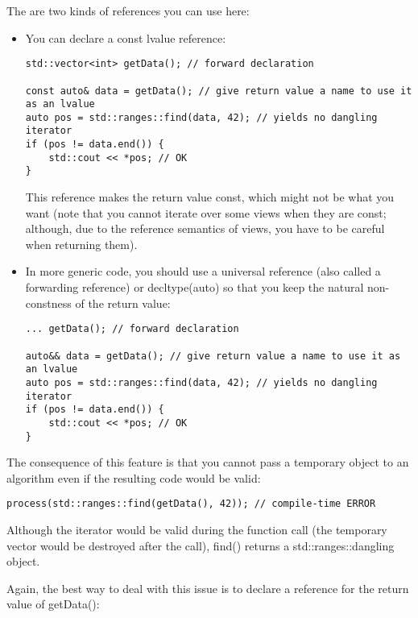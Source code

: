 The are two kinds of references you can use here:

\begin{itemize}
\item
You can declare a const lvalue reference:

\begin{lstlisting}[style=styleCXX]
std::vector<int> getData(); // forward declaration

const auto& data = getData(); // give return value a name to use it as an lvalue
auto pos = std::ranges::find(data, 42); // yields no dangling iterator
if (pos != data.end()) {
	std::cout << *pos; // OK
}
\end{lstlisting}

This reference makes the return value const, which might not be what you want (note that you cannot iterate over some views when they are const; although, due to the reference semantics of views, you have to be careful when returning them).

\item
In more generic code, you should use a universal reference (also called a forwarding reference) or decltype(auto) so that you keep the natural non-constness of the return value:

\begin{lstlisting}[style=styleCXX]
... getData(); // forward declaration

auto&& data = getData(); // give return value a name to use it as an lvalue
auto pos = std::ranges::find(data, 42); // yields no dangling iterator
if (pos != data.end()) {
	std::cout << *pos; // OK
}
\end{lstlisting}
\end{itemize}

The consequence of this feature is that you cannot pass a temporary object to an algorithm even if the resulting code would be valid:

\begin{lstlisting}[style=styleCXX]
process(std::ranges::find(getData(), 42)); // compile-time ERROR
\end{lstlisting}

Although the iterator would be valid during the function call (the temporary vector would be destroyed after the call), find() returns a std::ranges::dangling object.

Again, the best way to deal with this issue is to declare a reference for the return value of getData():

